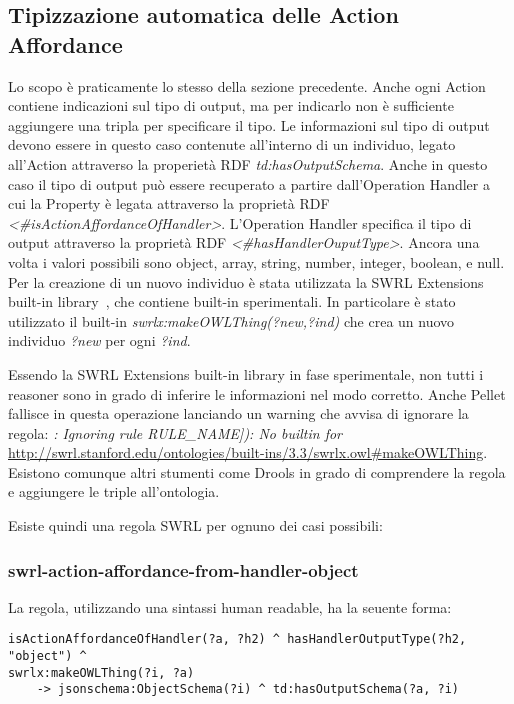 \subsection{Tipizzazione automatica delle Action Affordance}
Lo scopo è praticamente lo stesso della sezione precedente. Anche ogni Action contiene indicazioni sul tipo di output, ma per indicarlo non è sufficiente aggiungere una tripla per specificare il tipo. Le informazioni sul tipo di output devono essere in questo caso contenute all'interno di un individuo, legato all'Action attraverso la properietà RDF \textit{td:hasOutputSchema}. Anche in questo caso il tipo di output può essere recuperato a partire dall'Operation Handler a cui la Property è legata attraverso la proprietà RDF \textit{<\#isActionAffordanceOfHandler>}. L'Operation Handler specifica il tipo di output attraverso la proprietà RDF \textit{<\#hasHandlerOuputType>}. Ancora una volta i valori possibili sono object, array, string, number, integer, boolean, e null.\newline
Per la creazione di un nuovo individuo è stata utilizzata la SWRL Extensions built-in library~\cite{Extensio2:online}, che contiene built-in sperimentali. In particolare è stato utilizzato il built-in \textit{swrlx:makeOWLThing(?new,?ind)} che crea un nuovo individuo \textit{?new} per ogni \textit{?ind}.\newline
\begin{warn}
	Essendo la SWRL Extensions built-in library in fase sperimentale, non tutti i reasoner sono in grado di inferire le informazioni nel modo corretto. Anche Pellet fallisce in questa operazione lanciando un warning che avvisa di ignorare la regola:\newline\newline
	\noindent \color{red}{WARNING} \color{black}\textit{: Ignoring rule RULE\_NAME]): No builtin for} \url{http://swrl.stanford.edu/ontologies/built-ins/3.3/swrlx.owl#makeOWLThing}.\newline\newline
	\noindent Esistono comunque altri stumenti come Drools in grado di comprendere la regola e aggiungere le triple all'ontologia.
\end{warn}
\noindent Esiste quindi una regola SWRL per ognuno dei casi possibili:

\subsubsection{swrl-action-affordance-from-handler-object}
La regola, utilizzando una sintassi human readable, ha la seuente forma:
\begin{verbatim}
isActionAffordanceOfHandler(?a, ?h2) ^ hasHandlerOutputType(?h2, "object") ^
swrlx:makeOWLThing(?i, ?a)
	-> jsonschema:ObjectSchema(?i) ^ td:hasOutputSchema(?a, ?i)
\end{verbatim}

